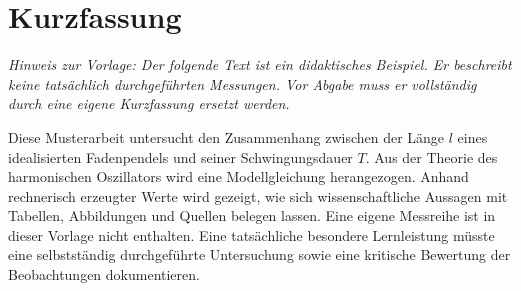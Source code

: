\chapter*{Kurzfassung}
\textit{Hinweis zur Vorlage: Der folgende Text ist ein didaktisches
Beispiel. Er beschreibt keine tatsächlich durchgeführten Messungen.
Vor Abgabe muss er vollständig durch eine eigene Kurzfassung ersetzt werden.}

Diese Musterarbeit untersucht den Zusammenhang zwischen der Länge
\(l\) eines idealisierten Fadenpendels und seiner Schwingungsdauer
\(T\). Aus der Theorie des harmonischen Oszillators wird eine
Modellgleichung herangezogen. Anhand rechnerisch erzeugter Werte wird
gezeigt, wie sich wissenschaftliche Aussagen mit Tabellen, Abbildungen
und Quellen belegen lassen. Eine eigene Messreihe ist in dieser
Vorlage nicht enthalten. Eine tatsächliche besondere Lernleistung
müsste eine selbstständig durchgeführte Untersuchung sowie eine
kritische Bewertung der Beobachtungen dokumentieren.
\clearpage
